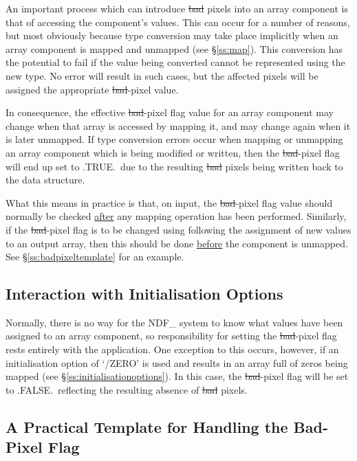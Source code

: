 An important process which can introduce \st{bad\/} pixels into an array
component is that of accessing the component's values. 
This can occur for a number of reasons, but most obviously because type
conversion may take place implicitly when an array component is mapped and
unmapped (see \S\ref{ss:map}).
This conversion has the potential to fail if the value being converted
cannot be represented using the new type. 
No error will result in such cases, but the affected pixels will be assigned
the appropriate \st{bad\/}-pixel value. 

In consequence, the effective \st{bad\/}-pixel flag value for an array
component may change when that array is accessed by mapping it, and may
change again when it is later unmapped. 
If type conversion errors occur when mapping or unmapping an array component
which is being modified or written, then the \st{bad\/}-pixel flag will end
up set to .TRUE.\ due to the resulting \st{bad\/} pixels being written back to
the data structure. 

What this means in practice is that, on input, the \st{bad\/}-pixel flag
value should normally be checked \underline{after} any mapping operation
has been performed. 
Similarly, if the \st{bad\/}-pixel flag is to be changed using 
following the assignment of new values to an output array, then this should
be done \underline{before} the component is unmapped.
See \S\ref{ss:badpixeltemplate} for an example.

\subsection{Interaction with Initialisation Options}

Normally, there is no way for the NDF\_ system to know what values have been 
assigned to an array component, so responsibility for setting the
\st{bad\/}-pixel flag rests entirely with the application. 
One exception to this occurs, however, if an initialisation option of
`/ZERO' is used and results in an array full of zeros being mapped (see
\S\ref{ss:initialisationoptions}). 
In this case, the \st{bad\/}-pixel flag will be set to .FALSE.\ reflecting the
resulting absence of \st{bad\/} pixels. 

\subsection{\label{ss:badpixeltemplate}A Practical Template for Handling the Bad-Pixel Flag}

